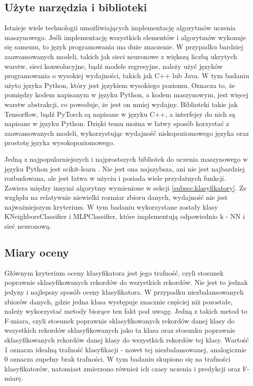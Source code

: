 \subsection{Użyte narzędzia i biblioteki}\label{subsec:narzedziaibiblioteki}
Istnieje wiele technologii umożliwiających implementację algorytmów uczenia maszynowego.
Jeśli implementację wszystkich elementów i algorytmów wykonuje się samemu, to język programowania ma duże znaczenie.
W przypadku bardziej zaawansowanych modeli, takich jak sieci neuronowe z większą liczbą ukrytych warstw, sieci konwolucyjne, bądź modele regresyjne,
należy użyć języków programowania o wysokiej wydajności, takich jak C++ lub Java. W tym badaniu użyto języka Python, który jest językiem wysokiego poziomu.
Oznacza to, że pomiędzy kodem napisanym w języku Python, a kodem maszynowym, jest więcej warstw abstrakcji, co powoduje, że jest on mniej wydajny.
Biblioteki takie jak Tensorflow, bądź PyTorch są napisane w języku C++, a interfejsy do nich są napisane w języku Python. Dzięki temu można w łatwy sposób korzystać z zaawansowanych modeli,
wykorzystując wydajność niskopoziomowego języka oraz prostotę języka wysokopoziomowego.

Jedną z najpopularniejszych i najprostszych bibliotek do uczenia maszynowego w języku Python jest scikit-learn\cite{scikit-learn} . Nie jest ona najszybsza, ani nie jest najbardziej rozbudowana,
ale jest łatwa w użyciu i posiada wiele przydatnych funkcji. Zawiera między innymi algorytmy wymienione w sekcji \ref{subsec:klasyfikatory}. Ze względu na relatywnie niewielki rozmiar zbioru danych,
wydajność nie jest najważniejszym kryterium. W tym badaniu wykorzystane zostały klasy KNeighborsClassifier i MLPClassifier, które implementują odpowiednio k - NN i sieć neuronową.

\subsection{Miary oceny}\label{subsec:miaryoceny}
Głównym kryterium oceny klasyfikatora jest jego trafność, czyli stosunek poprawnie sklasyfikowanych rekordów do wszystkich rekordów.
Nie jest to jednak jedyny i najlepszy sposób oceny klasyfikatora. W przypadku niezbalansowanych zbiorów danych, gdzie jedna klasa występuje znacznie częściej niż pozostałe,
należy wykorzystać metody biorące ten fakt pod uwagę. Jedną z takich metod to F-miara, czyli stosunek poprawnie sklasyfikowanych rekordów danej klasy do wszystkich rekordów sklasyfikowanych
jako ta klasa oraz stosunku poprawnie sklasyfikowanych rekordów danej klasy do wszystkich rekordów tej klasy. Wartość 1 oznacza idealną trafność klasyfikacji - nawet tej niezbalansowanej, 
analogicznie 0 oznacza zupełny brak trafności. W tym badaniu skupiono się na trafności klasyfikatorów, natomiast zmierzono również ich czasy uczenia i predykcji oraz F-miarę.